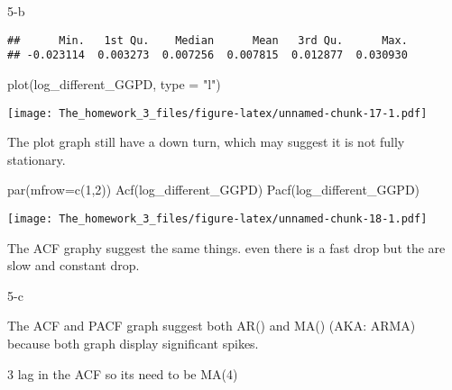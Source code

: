 \documentclass[
]{article}
\newenvironment{Shaded}{\begin{snugshade}}{\end{snugshade}}
\newcommand{\AttributeTok}[1]{\textcolor[rgb]{0.77,0.63,0.00}{#1}}
\newcommand{\CommentTok}[1]{\textcolor[rgb]{0.56,0.35,0.01}{\textit{#1}}}
\newcommand{\DecValTok}[1]{\textcolor[rgb]{0.00,0.00,0.81}{#1}}
\newcommand{\FunctionTok}[1]{\textcolor[rgb]{0.00,0.00,0.00}{#1}}
\newcommand{\NormalTok}[1]{#1}
\newcommand{\OtherTok}[1]{\textcolor[rgb]{0.56,0.35,0.01}{#1}}
\newcommand{\SpecialCharTok}[1]{\textcolor[rgb]{0.00,0.00,0.00}{#1}}
\newcommand{\StringTok}[1]{\textcolor[rgb]{0.31,0.60,0.02}{#1}}
\begin{document}
5-b

\begin{Shaded}
\end{Shaded}

\begin{verbatim}
##      Min.   1st Qu.    Median      Mean   3rd Qu.      Max. 
## -0.023114  0.003273  0.007256  0.007815  0.012877  0.030930
\end{verbatim}

\begin{Shaded}
\begin{Highlighting}[]
\FunctionTok{plot}\NormalTok{(log\_different\_GGPD, }\AttributeTok{type =} \StringTok{"l"}\NormalTok{)}
\end{Highlighting}
\end{Shaded}

\texttt{[image: The\_homework\_3\_files/figure-latex/unnamed-chunk-17-1.pdf]}

The plot graph still have a down turn, which may suggest it is not fully
stationary.

\begin{Shaded}
\begin{Highlighting}[]
\FunctionTok{par}\NormalTok{(}\AttributeTok{mfrow=}\FunctionTok{c}\NormalTok{(}\DecValTok{1}\NormalTok{,}\DecValTok{2}\NormalTok{))}
\FunctionTok{Acf}\NormalTok{(log\_different\_GGPD)}
\FunctionTok{Pacf}\NormalTok{(log\_different\_GGPD)}
\end{Highlighting}
\end{Shaded}

\texttt{[image: The\_homework\_3\_files/figure-latex/unnamed-chunk-18-1.pdf]}

The ACF graphy suggest the same things. even there is a fast drop but
the are slow and constant drop.

5-c

The ACF and PACF graph suggest both AR() and MA() (AKA: ARMA) because
both graph display significant spikes.

3 lag in the ACF so its need to be MA(4)
\end{document}
